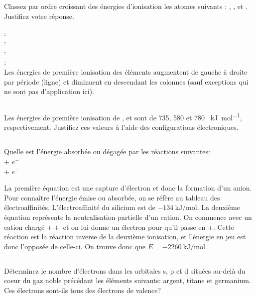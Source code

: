 \subsection{}
Classez par ordre croissant des énergies d'ionisation les atomes suivants : , , et . Justifiez votre réponse.
\begin{solution}
	: \\
	: \\
	: \\
	: \\
	
	Les énergies de première ionisation des éléments augmentent de gauche à droite par période (ligne) et diminuent en descendant les colonnes (sauf exceptions qui ne sont pas d'application ici).
\end{solution}

\subsection{}
Les énergies de première ionisation de ,  et  sont de 735, 580 et 780 \SI{}{\kilo\joule\per\mole}, respectivement. Justifiez ces valeurs à l'aide des configurations électroniques.
\begin{solution}
	
\end{solution}

\subsection{}
Quelle est l'énergie absorbée ou dégagée par les réactions suivantes:\\
 + $e^-$ \ce{->} \\
 + $e^-$ \ce{->} 
\begin{solution}
	La première équation est une capture d'électron et donc la formation d'un anion. Pour connaître l'énergie émise ou absorbée, on se réfère au tableau des électroaffinités. L'électroaffinité du silicium est de $\SI{-134}{\kilo\joule\per\mole}$.
	La deuxième équation représente la neutralisation partielle d'un cation. On commence avec un cation chargé $++$ et on lui donne un électron pour qu'il passe en $+$. Cette réaction est la réaction inverse de la deuxième ionisation, et l'énergie en jeu est donc l'opposée de celle-ci. On trouve donc que $E = \SI{-2260}{\kilo\joule\per\mole}$.
\end{solution}

\subsection{}
Déterminez le nombre d'électrons dans les orbitales s, p et d situées au-delà du coeur du gaz noble précédant les éléments suivants: argent, titane et germanium. Ces électrons sont-ils tous des électrons de valence?
\begin{solution}
	
\end{solution}
\subsection{}

